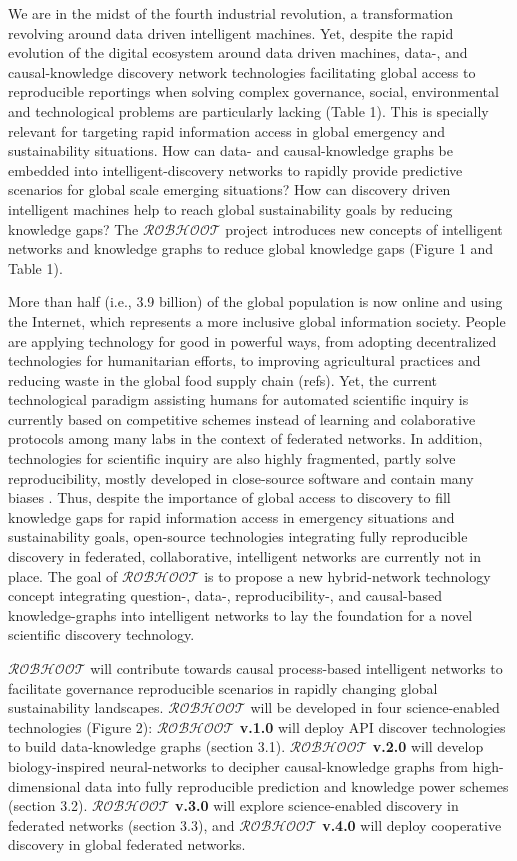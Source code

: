 \documentclass[12pt, a4paper]{article} %
\begin{document}
We are in the midst of the fourth industrial revolution, a
transformation revolving around data driven intelligent machines. Yet,
despite the rapid evolution of the digital ecosystem around data
driven machines, data-, and causal-knowledge discovery network
technologies facilitating global access to reproducible reportings
when solving complex governance, social, environmental and
technological problems are particularly lacking (Table 1). This is
specially relevant for targeting rapid information access in global
emergency and sustainability situations. How can data- and
causal-knowledge graphs be embedded into intelligent-discovery
networks to rapidly provide predictive scenarios for global scale
emerging situations? How can discovery driven intelligent machines
help to reach global sustainability goals by reducing knowledge gaps?
The $\mathcal{ROBHOOT}$ project introduces new concepts of intelligent
networks and knowledge graphs to reduce global knowledge gaps (Figure
1 and Table 1).

More than half (i.e., 3.9 billion) of the global population is now
online and using the Internet, which represents a more inclusive
global information society. People are applying technology for good in
powerful ways, from adopting decentralized technologies for
humanitarian efforts, to improving agricultural practices and reducing
waste in the global food supply chain (refs). Yet, the current
technological paradigm assisting humans for automated scientific
inquiry is currently based on competitive schemes instead of learning
and colaborative protocols among many labs in the context of federated
networks. In addition, technologies for scientific inquiry are also
highly fragmented, partly solve reproducibility, mostly developed in
close-source software and contain many biases
\citep{Inhaber1977,Ioannidis2005,Fang2011,Gunther2018,Hardwicke2018}. Thus,
despite the importance of global access to discovery to fill knowledge
gaps for rapid information access in emergency situations and
sustainability goals, open-source technologies integrating fully
reproducible discovery in federated, collaborative, intelligent
networks are currently not in place. The goal of $\mathcal{ROBHOOT}$
is to propose a new hybrid-network technology concept integrating
question-, data-, reproducibility-, and causal-based knowledge-graphs
into intelligent networks to lay the foundation for a novel scientific
discovery technology.

$\mathcal{ROBHOOT}$ will contribute towards causal process-based
intelligent networks to facilitate governance reproducible scenarios
in rapidly changing global sustainability
landscapes. $\mathcal{ROBHOOT}$ will be developed in four
science-enabled technologies (Figure 2): {\bf $\mathcal{ROBHOOT}$
  v.1.0} will deploy API discover technologies to build data-knowledge
graphs (section 3.1). {\bf $\mathcal{ROBHOOT}$ v.2.0} will develop
biology-inspired neural-networks to decipher causal-knowledge graphs
from high-dimensional data into fully reproducible prediction and
knowledge power schemes (section 3.2). {\bf $\mathcal{ROBHOOT}$ v.3.0}
will explore science-enabled discovery in federated networks (section
3.3), and {\bf $\mathcal{ROBHOOT}$ v.4.0} will deploy cooperative
discovery in global federated networks.
\end{document}
